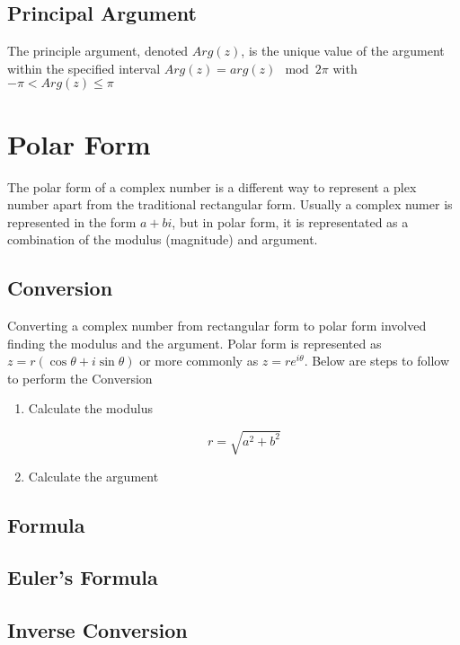 \documentclass[12pt]{article}
\begin{document}
    \subsection{Principal Argument}

    The principle argument, denoted $Arg(z)$, is the unique value of the argument within the specified interval 
    $Arg(z) = arg(z) \mod 2\pi$ with $-\pi < Arg(z)\le\pi$

    \section{Polar Form}

    The polar form of a complex number is a different way to represent a plex number apart from the 
    traditional rectangular form. Usually a complex numer is represented in the form $a + bi$, but in 
    polar form, it is representated as a combination of the modulus (magnitude) and argument.

    \subsection{Conversion}

    Converting a complex number from rectangular form to polar form involved finding the modulus and the argument. 
    Polar form is represented as $z = r(\cos\theta + i\sin\theta)$ or more commonly as $z = re^{i\theta}$. Below are 
    steps to follow to perform the Conversion
    
    \begin{enumerate}
        
        \item Calculate the modulus
        
        \[
            r = \sqrt{a^2 + b^2}    
        \]

        \item Calculate the argument
        
        

    \end{enumerate}

    \subsection{Formula}
    \subsection{Euler's Formula}
    \subsection{Inverse Conversion}
\end{document}
